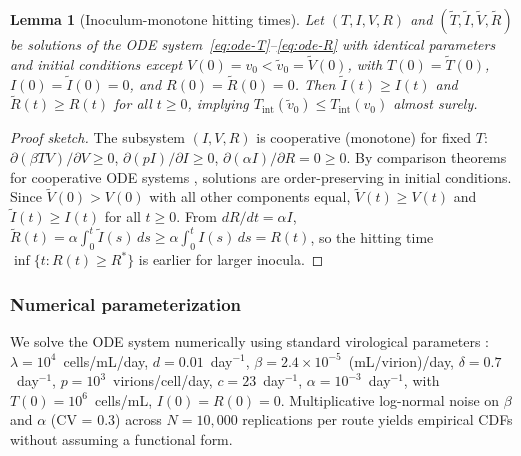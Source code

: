 \documentclass[12pt,a4paper]{article}
\theoremstyle{plain}
\newtheorem{lemma}[theorem]{Lemma}
\theoremstyle{definition}
\theoremstyle{remark}
\begin{document}
\begin{lemma}[Inoculum-monotone hitting times]\label{lem:monotone}
Let $(T, I, V, R)$ and $(\tilde{T}, \tilde{I}, \tilde{V}, \tilde{R})$ be solutions of the ODE system~\eqref{eq:ode-T}--\eqref{eq:ode-R} with identical parameters and initial conditions except $V(0) = v_0 < \tilde{v}_0 = \tilde{V}(0)$, with $T(0) = \tilde{T}(0)$, $I(0) = \tilde{I}(0) = 0$, and $R(0) = \tilde{R}(0) = 0$. Then $\tilde{I}(t) \geq I(t)$ and $\tilde{R}(t) \geq R(t)$ for all $t \geq 0$, implying $T_{\mathrm{int}}(\tilde{v}_0) \leq T_{\mathrm{int}}(v_0)$ almost surely.
\end{lemma}

\begin{proof}[Proof sketch]
\begin{sloppypar}
The subsystem $(I, V, R)$ is cooperative (monotone) for fixed $T$: $\partial(\beta TV)/\partial V \geq 0$, $\partial(pI)/\partial I \geq 0$, $\partial(\alpha I)/\partial R = 0 \geq 0$. By comparison theorems for cooperative ODE systems \citep{ref:Smith1995}, solutions are order-preserving in initial conditions. Since $\tilde{V}(0) > V(0)$ with all other components equal, $\tilde{V}(t) \geq V(t)$ and $\tilde{I}(t) \geq I(t)$ for all $t \geq 0$. From $dR/dt = \alpha I$, $\tilde{R}(t) = \alpha \int_0^t \tilde{I}(s)\,ds \geq \alpha \int_0^t I(s)\,ds = R(t)$, so the hitting time $\inf\{t : R(t) \geq R^*\}$ is earlier for larger inocula.
\end{sloppypar}
\end{proof}

\subsubsection{Numerical parameterization}

We solve the ODE system numerically using standard virological parameters \citep{ref:Perelson1996,ref:McMichael2010}: $\lambda = 10^4$~cells/mL/day, $d = 0.01$~day$^{-1}$, $\beta = 2.4 \times 10^{-5}$~(mL/virion)/day, $\delta = 0.7$~day$^{-1}$, $p = 10^3$~virions/cell/day, $c = 23$~day$^{-1}$, $\alpha = 10^{-3}$~day$^{-1}$, with $T(0) = 10^6$~cells/mL, $I(0) = R(0) = 0$. Multiplicative log-normal noise on $\beta$ and $\alpha$ (CV = 0.3) across $N = 10{,}000$ replications per route yields empirical CDFs without assuming a functional form.
\end{document}
